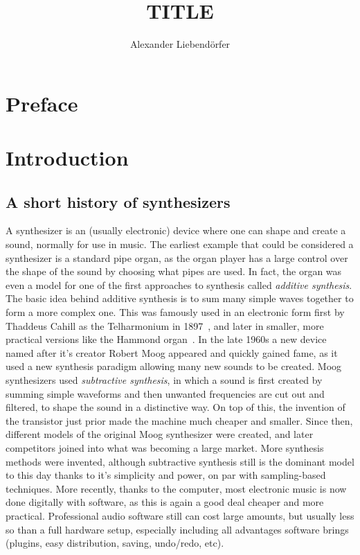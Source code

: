 \documentclass[11pt,a4paper]{article}
\title{\LARGE \textbf {TITLE} \vspace{1em}}
\author{Alexander Liebend\"{o}rfer}
\begin{document}
\maketitle
\clearpage
\tableofcontents

\clearpage

\section{Preface}



\section{Introduction}

\subsection{A short history of synthesizers}

A synthesizer is an (usually electronic) device where one can shape and create a sound, normally for use in music. The earliest example that could be considered a synthesizer is a standard pipe organ, as the organ player has a large control over the shape of the sound by choosing what pipes are used. In fact, the organ was even a model for one of the first approaches to synthesis called \emph{additive synthesis}. The basic idea behind additive synthesis is to sum many simple waves together to form a more complex one. This was famously used in an electronic form first by Thaddeus Cahill as the Telharmonium in 1897~\cite{Telharmonium}, and later in smaller, more practical versions like the Hammond organ~\cite{Hammond}.
In the late 1960s a new device named after it's creator Robert Moog appeared and quickly gained fame, as it used a new synthesis paradigm allowing many new sounds to be created. Moog synthesizers used \emph{subtractive synthesis}, in which a sound is first created by summing simple waveforms and then unwanted frequencies are cut out and filtered, to shape the sound in a distinctive way. On top of this, the invention of the transistor just prior made the machine much cheaper and smaller. Since then, different models of the original Moog synthesizer were created, and later competitors joined into what was becoming a large market. More synthesis methods were invented, although subtractive synthesis still is the dominant model to this day thanks to it's simplicity and power, on par with sampling-based techniques. More recently, thanks to the computer, most electronic music is now done digitally with software, as this is again a good deal cheaper and more practical. Professional audio software still can cost large amounts, but usually less so than a full hardware setup, especially including all advantages software brings (plugins, easy distribution, saving, undo/redo, etc).
\end{document}
